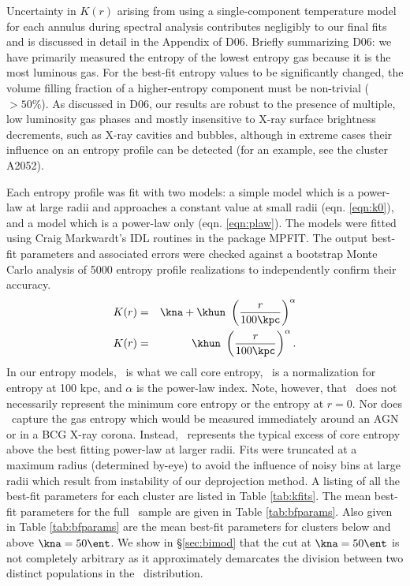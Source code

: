 \documentclass[apj]{emulateapj}
\begin{document}
Uncertainty in $K(r)$ arising from using a single-component
temperature model for each annulus during spectral analysis
contributes negligibly to our final fits and is discussed in detail in
the Appendix of D06. Briefly summarizing D06: we have primarily
measured the entropy of the lowest entropy gas because it is the most
luminous gas. For the best-fit entropy values to be significantly
changed, the volume filling fraction of a higher-entropy component
must be non-trivial ($> 50\%$). As discussed in D06, our results are
robust to the presence of multiple, low luminosity gas phases and
mostly insensitive to X-ray surface brightness decrements, such as
X-ray cavities and bubbles, although in extreme cases their influence
on an entropy profile can be detected (for an example, see the cluster
A2052).

Each entropy profile was fit with two models: a simple model which is
a power-law at large radii and approaches a constant value at small
radii (eqn. \ref{eqn:k0}), and a model which is a power-law only
(eqn. \ref{eqn:plaw}). The models were fitted using Craig Markwardt's
IDL routines in the package MPFIT. The output best-fit parameters and
associated errors were checked against a bootstrap Monte Carlo
analysis of 5000 entropy profile realizations to independently confirm
their accuracy.
\begin{eqnarray}
K(r) &=& \kna + \khun\ \left(\frac{r}{100 \kpc}\right)^{\alpha}\label{eqn:k0}\\
K(r) &=& \khun\ \left(\frac{r}{100 \kpc}\right)^{\alpha}\label{eqn:plaw}.
\end{eqnarray}
In our entropy models, \kna\ is what we call core entropy, \khun\ is a
normalization for entropy at 100 kpc, and $\alpha$ is the power-law
index. Note, however, that \kna\ does not necessarily represent the
minimum core entropy or the entropy at $r=0$. Nor does \kna\ capture
the gas entropy which would be measured immediately around an AGN or
in a BCG X-ray corona. Instead, \kna\ represents the typical excess of
core entropy above the best fitting power-law at larger radii. Fits
were truncated at a maximum radius (determined by-eye) to avoid the
influence of noisy bins at large radii which result from instability
of our deprojection method. A listing of all the best-fit parameters
for each cluster are listed in Table \ref{tab:kfits}. The mean
best-fit parameters for the full \accept\ sample are given in Table
\ref{tab:bfparams}. Also given in Table \ref{tab:bfparams} are the
mean best-fit parameters for clusters below and above $\kna = 50
\ent$. We show in \S\ref{sec:bimod} that the cut at $\kna=50 \ent$ is
not completely arbitrary as it approximately demarcates the division
between two distinct populations in the \kna\ distribution.
\end{document}
